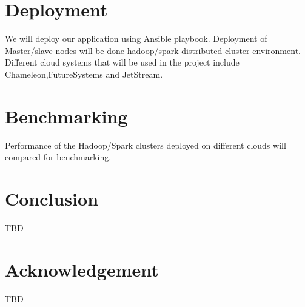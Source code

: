 \documentclass[9pt,twocolumn,twoside]{../../styles/osajnl}
\begin{document}
\section{Deployment}
	We will deploy our application using Ansible\cite{www-ansible} playbook. Deployment
	of Master/slave nodes will be done hadoop/spark distributed cluster environment.
	Different cloud systems that will be used in the project include
	Chameleon,FutureSystems and JetStream.

\section{Benchmarking}
	Performance of the Hadoop/Spark clusters deployed on different clouds will
	compared for benchmarking.

\section{Conclusion}

TBD

\section{Acknowledgement}
TBD


\end{document}
